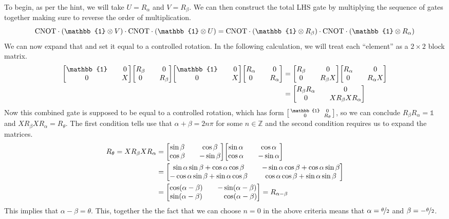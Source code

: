 \documentclass[boxes]{homework}
\begin{document}
\begin{solution}
	To begin, as per the hint, we will take $U = R_\alpha$ and $V = R_\beta$. We can then construct the total LHS gate by multiplying the sequence of gates together making sure to reverse the order of multiplication.
	\begin{equation*}
		\mathrm{CNOT}\cdot\qty(\mathbb{1}\otimes V)\cdot\mathrm{CNOT}\cdot\qty(\mathbb{1}\otimes U) = \mathrm{CNOT}\cdot\qty(\mathbb{1}\otimes R_\beta)\cdot\mathrm{CNOT}\cdot\qty(\mathbb{1}\otimes R_\alpha)
	\end{equation*}
	We can now expand that and set it equal to a controlled rotation. In the following calculation, we will treat each ``element'' as a $2\times 2$ block matrix.
	\begin{align*}
		\mqty[\mathbb{1} && 0 \\ 0 && X]\mqty[R_\beta && 0 \\ 0 && R_\beta]\mqty[\mathbb{1} && 0 \\ 0 && X]\mqty[R_\alpha && 0 \\ 0 && R_\alpha] &= \mqty[R_\beta && 0 \\ 0 && R_\beta X]\mqty[R_\alpha && 0 \\ 0 && R_\alpha X] \\
		&= \mqty[R_\beta R_\alpha && 0 \\ 0 && XR_\beta X R_\alpha]
	\end{align*}
	Now this combined gate is supposed to be equal to a controlled rotation, which has form $\smqty[\mathbb{1} && 0 \\ 0 && R_\theta]$, so we can conclude $R_\beta R_\alpha = \mathbb{1}$ and $XR_\beta X R_\alpha = R_\theta$. The first condition tells use that $\alpha + \beta = 2n\pi$ for some $n\in\mathbb{Z}$ and the second condition requires us to expand the matrices.
	\begin{align*}
		R_\theta = XR_\beta X R_\alpha &= \mqty[\sin\beta && \cos\beta \\ \cos\beta && -\sin\beta]\mqty[\sin\alpha && \cos\alpha \\ \cos\alpha && -\sin\alpha] \\
		&= \mqty[\sin\alpha\sin\beta + \cos\alpha\cos\beta && -\sin\alpha\cos\beta + \cos\alpha\sin\beta \\ -\cos\alpha\sin\beta + \sin\alpha\cos\beta && \cos\alpha\cos\beta + \sin\alpha\sin\beta] \\
		&= \mqty[\cos(\alpha - \beta) && -\sin(\alpha - \beta) \\ \sin(\alpha - \beta) && \phantom{-}\cos(\alpha - \beta)] = R_{\alpha - \beta}
	\end{align*}
	This implies that $\alpha - \beta = \theta$. This, together the the fact that we can choose $n = 0$ in the above criteria means that $\alpha = \nicefrac{\theta}{2}$ and $\beta = -\nicefrac{\theta}{2}$.
\end{solution}
\end{document}
